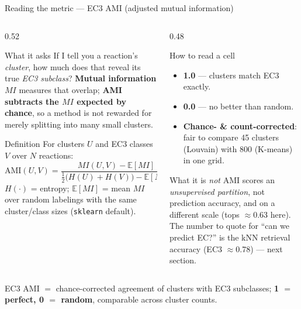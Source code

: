 \documentclass[aspectratio=169,10pt]{beamer}
\newcommand{\best}[1]{{\color{cGood}\textbf{#1}}}
\newcommand{\bad}[1]{{\color{cBad}#1}}
\newcommand{\takeaway}[1]{\vfill\begin{tcolorbox}[colback=structure!12!white,colframe=structure!60!black,
  boxrule=0.4pt,left=5pt,right=5pt,top=3pt,bottom=3pt]\small #1\end{tcolorbox}}
\begin{document}
\begin{frame}{Reading the metric --- EC3 AMI (adjusted mutual information)}
  \begin{columns}[T]
    \begin{column}{0.52\textwidth}
      \begin{block}{What it asks}\small
        If I tell you a reaction's \emph{cluster}, how much does that reveal
        its true \emph{EC3 subclass}? \textbf{Mutual information} $MI$ measures
        that overlap; \textbf{AMI subtracts the $MI$ expected by chance}, so a
        method is not rewarded for merely splitting into many small clusters.
      \end{block}
      \begin{block}{Definition}\small
        For clusters $U$ and EC3 classes $V$ over $N$ reactions:
        \[
          \mathrm{AMI}(U,V)=\frac{MI(U,V)-\mathbb{E}[MI]}
          {\tfrac12\!\big(H(U)+H(V)\big)-\mathbb{E}[MI]}
        \]
        $H(\cdot)$ = entropy; $\mathbb{E}[MI]$ = mean $MI$ over random
        labelings with the same cluster/class sizes (\texttt{sklearn} default).
      \end{block}
    \end{column}
    \begin{column}{0.48\textwidth}
      \begin{block}{How to read a cell}\small
        \begin{itemize}
          \item \best{1.0} --- clusters match EC3 exactly.
          \item \textbf{0.0} --- no better than random.
          \item \textbf{Chance- \& count-corrected}: fair to compare 45 clusters
            (Louvain) with 800 (K-means) in one grid.
        \end{itemize}
      \end{block}
      \begin{block}{What it is \emph{not}}\small
        AMI scores an \emph{unsupervised partition}, not prediction accuracy,
        and on a different scale (tops $\approx$0.63 here). \bad{The number to
        quote for ``can we predict EC?'' is the kNN retrieval accuracy}
        (EC3 $\approx$0.78) --- next section.
      \end{block}
    \end{column}
  \end{columns}
  \takeaway{EC3 AMI $=$ chance-corrected agreement of clusters with EC3 subclasses; \best{1 $=$ perfect, 0 $=$ random}, comparable across cluster counts.}
\end{frame}
\end{document}
